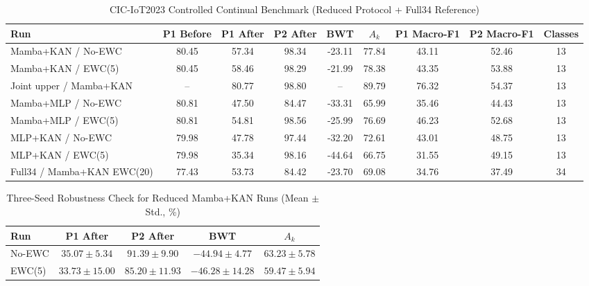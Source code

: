 \documentclass[a4paper,fleqn]{cas-dc}
\begin{document}
\begin{table}[htbp]
\caption{CIC-IoT2023 Controlled Continual Benchmark (Reduced Protocol + Full34 Reference)}
\label{tab:mainbench}
\centering
\begin{tabular}{lcccccccc}
\toprule
Run & P1 Before & P1 After & P2 After & BWT & $A_k$ & P1 Macro-F1 & P2 Macro-F1 & Classes \\
\midrule
Mamba+KAN / No-EWC & 80.45 & 57.34 & 98.34 & -23.11 & 77.84 & 43.11 & 52.46 & 13 \\
Mamba+KAN / EWC(5) & 80.45 & 58.46 & 98.29 & -21.99 & 78.38 & 43.35 & 53.88 & 13 \\
Joint upper / Mamba+KAN & -- & 80.77 & 98.80 & -- & 89.79 & 76.32 & 54.37 & 13 \\
Mamba+MLP / No-EWC & 80.81 & 47.50 & 84.47 & -33.31 & 65.99 & 35.46 & 44.43 & 13 \\
Mamba+MLP / EWC(5) & 80.81 & 54.81 & 98.56 & -25.99 & 76.69 & 46.23 & 52.68 & 13 \\
MLP+KAN / No-EWC & 79.98 & 47.78 & 97.44 & -32.20 & 72.61 & 43.01 & 48.75 & 13 \\
MLP+KAN / EWC(5) & 79.98 & 35.34 & 98.16 & -44.64 & 66.75 & 31.55 & 49.15 & 13 \\
Full34 / Mamba+KAN EWC(20) & 77.43 & 53.73 & 84.42 & -23.70 & 69.08 & 34.76 & 37.49 & 34 \\
\bottomrule
\end{tabular}
\end{table}

\begin{table}[htbp]
\caption{Three-Seed Robustness Check for Reduced Mamba+KAN Runs (Mean $\pm$ Std., \%)}
\label{tab:main-multiseed}
\centering
\scriptsize
\begin{tabular}{lcccc}
\toprule
Run & P1 After & P2 After & BWT & $A_k$ \\
\midrule
No-EWC & $35.07\pm5.34$ & $91.39\pm9.90$ & $-44.94\pm4.77$ & $63.23\pm5.78$ \\
EWC(5) & $33.73\pm15.00$ & $85.20\pm11.93$ & $-46.28\pm14.28$ & $59.47\pm5.94$ \\
\bottomrule
\end{tabular}
\end{table}
\end{document}
